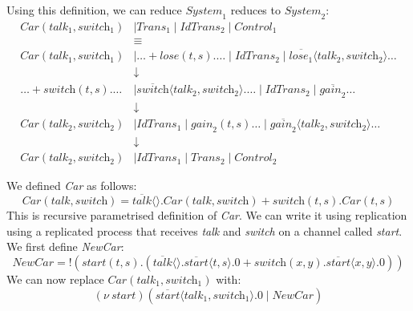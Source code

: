 \documentclass[a4paper, openany]{memoir}
\theoremstyle{definition}
\begin{document}
    Using this definition, we can reduce $\textit{System}_1$ reduces to $\textit{System}_2$:
    \begin{align*}
        \textit{Car}(\textit{talk}_1, \textit{switch}_1) &\mid \textit{Trans}_1 \mid \textit{IdTrans}_2 \mid \textit{Control}_1 \\
        &\equiv \\
        \textit{Car}(\textit{talk}_1, \textit{switch}_1) &\mid \dots + \textit{lose}(t, s).\dots \mid \textit{IdTrans}_2 \mid \overline{\textit{lose}_1} \langle \textit{talk}_2, \textit{switch}_2 \rangle \dots \\
        &\downarrow \\
        \dots + \textit{switch}(t, s).\dots &\mid \overline{\textit{switch}} \langle \textit{talk}_2, \textit{switch}_2 \rangle.\dots \mid \textit{IdTrans}_2 \mid \overline{\textit{gain}_2} \dots \\
        &\downarrow \\
        \textit{Car}(\textit{talk}_2, \textit{switch}_2) &\mid \textit{IdTrans}_1 \mid \textit{gain}_2(t, s)\dots \mid \overline{\textit{gain}_2} \langle \textit{talk}_2, \textit{switch}_2 \rangle \dots \\
        &\downarrow \\
        \textit{Car}(\textit{talk}_2, \textit{switch}_2) &\mid \textit{IdTrans}_1 \mid \textit{Trans}_2 \mid \textit{Control}_2
    \end{align*}


    We defined \textit{Car} as follows:
    \[\textit{Car}(\textit{talk}, \textit{switch}) = \overline{\textit{talk}} \langle \rangle.\textit{Car} (\textit{talk}, \textit{switch}) + \textit{switch} (t, s).\textit{Car}(t, s)\]
    This is recursive parametrised definition of \textit{Car}. We can write it using replication using a replicated process that receives \textit{talk} and \textit{switch} on a channel called \textit{start}. We first define \textit{NewCar}:
    \[\textit{NewCar} = !(\textit{start}(t, s).(
        \overline{\textit{talk}} \langle \rangle.\overline{\textit{start}}\langle t, s \rangle.0 + 
        \textit{switch}(x, y).\overline{start} \langle x, y \rangle.0
    ))\]
    We can now replace $\textit{Car}(\textit{talk}_1, \textit{switch}_1)$ with:
    \[(\nu \ \textit{start})(\overline{\textit{start}} \langle \textit{talk}_1, \textit{switch}_1 \rangle.0 \mid \textit{NewCar})\]
\end{document}
